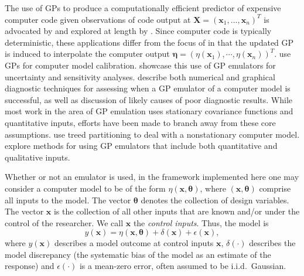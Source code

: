 \documentclass[12pt]{article}
\begin{document}
%
The use of GPs to produce a computationally efficient predictor of expensive computer code given observations of code output at $\mathbf X=(\mathbf x_1,\ldots,\mathbf x_n)^T$ is advocated by \cite{Sacks1989} and explored at length by \cite{Santner2003a}.
%
Since computer code is typically deterministic, these applications differ from the focus of \cite{OHagan1978} in that the updated GP is induced to interpolate the computer output $\boldsymbol \eta = (\eta(\mathbf x_1),\cdots,\eta(\mathbf x_n))^T$. 
%
\cite{Kennedy2001} use GPs for computer model calibration. 
%
\cite{Kennedy2006} showcase this use of GP emulators for uncertainty and sensitivity analyses. 
%
\cite{Bastos2009} describe both numerical and graphical diagnostic techniques for assessing when a GP emulator of a computer model is successful, as well as discussion of likely causes of poor diagnostic results. 
%
While most work in the area of GP emulation uses stationary covariance functions 
and quantitative inputs, efforts have been made to branch away from these core assumptions. 
%
\cite{Gramacy2008} use treed partitioning to deal with a nonstationary computer model. 
%
\cite{Qian2008} explore methods for using GP emulators that include both quantitative and qualitative inputs.
%

%
Whether or not an emulator is used, in the framework implemented here one may consider a computer model to be of the form $\eta(\mathbf x,\boldsymbol \theta)$, where $(\mathbf x,\boldsymbol \theta)$ comprise all inputs to the model. 
%
The vector $\boldsymbol \theta$ denotes the collection of design variables. 
%
The vector $\mathbf x$ is the collection of all other inputs that are known and/or under the control of the researcher.
%
We call $\mathbf x$ the \emph{control inputs}.
%
Thus, the model is
%
\begin{equation} \label{eq:model_gen}
y(\mathbf x)=\eta(\mathbf x,\boldsymbol \theta) + \delta(\mathbf x)+\epsilon(\mathbf x),
\end{equation} 
%
where $y(\mathbf x)$ describes a model outcome at control inputs $\mathbf x$, $\delta(\cdot)$ describes the model discrepancy (the systematic bias of the model as an estimate of the response) and $\epsilon(\cdot)$ is a mean-zero error, often assumed to be i.i.d.\ Gaussian. 
%
\end{document}
